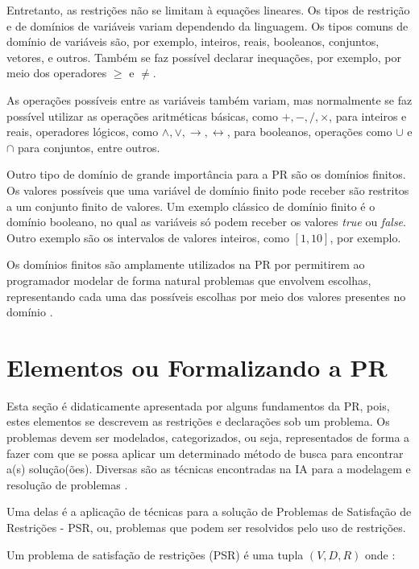 Entretanto, as restrições não se limitam à equações lineares. Os tipos de restrição e de domínios de variáveis variam dependendo da linguagem. Os tipos comuns de domínio de variáveis são, por exemplo, inteiros, reais, booleanos, conjuntos, vetores, e outros. Também se faz possível declarar inequações, por exemplo, por meio dos operadores $\ge$ e $\not=$.

As operações possíveis entre as variáveis também variam, mas normalmente se faz possível utilizar as operações aritméticas básicas, como $+, -, /, \times$, para inteiros e reais, operadores lógicos, como $\wedge, \vee, \rightarrow, \leftrightarrow$, para booleanos, operações como $\cup$ e $\cap$ para conjuntos, entre outros.

Outro tipo de domínio de grande importância para a PR são os domínios finitos. Os valores possíveis que uma variável de domínio finito pode receber são restritos a um conjunto finito de valores. Um exemplo clássico de domínio finito é o domínio booleano, no qual as variáveis só podem receber os valores \textit{true} ou \textit{false}. Outro exemplo são os intervalos de valores inteiros, como $[1,10]$, por exemplo.

Os domínios finitos são amplamente utilizados na PR por permitirem ao programador modelar de forma natural problemas que envolvem escolhas, representando cada uma das possíveis escolhas por meio dos valores presentes no domínio \cite{stuckey}.



 \section{Elementos ou Formalizando a  PR}

Esta seção é   didaticamente apresentada por alguns fundamentos da PR, pois, estes elementos
se descrevem as restrições  e declarações sob um problema. Os problemas devem ser modelados, categorizados, ou seja, representados de forma a fazer com que se possa aplicar um determinado método de busca para encontrar a(s) solução(ões). Diversas são as técnicas encontradas na IA para a modelagem e resolução de problemas \cite{RusNorv2010}.

Uma delas é a aplicação de técnicas para a solução de Problemas de Satisfação de Restrições - PSR, ou, problemas que podem ser resolvidos pelo uso de restrições.

Um problema de satisfação de restrições (PSR) é uma tupla $(V,D,R)$ onde \cite{apt_2003}:

